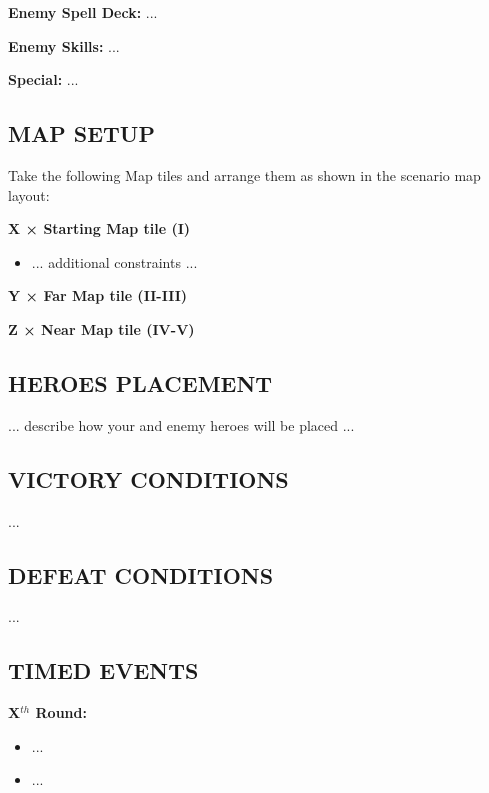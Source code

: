 \begin{multicols*}{2}
\textbf{Enemy Spell Deck:} ...

\textbf{Enemy Skills:} ...

\textbf{Special:} ...

\subsection*{\MakeUppercase{Map setup}}

Take the following Map tiles and arrange them as shown in the scenario map layout:

\textbf{X × Starting Map tile (I)}
\begin{itemize}
    \item ... additional constraints ...
\end{itemize}

\textbf{Y × Far Map tile (II-III)}

\textbf{Z × Near Map tile (IV-V)}

\subsection*{\MakeUppercase{Heroes placement}}

... describe how your and enemy heroes will be placed ...

\subsection*{\MakeUppercase{Victory Conditions}}
...

\subsection*{\MakeUppercase{Defeat Conditions}}
...

\subsection*{\MakeUppercase{Timed Events}}

\textbf{X$^{th}$ Round:}
\begin{itemize}
  \item ...
  \item ...
\end{itemize}

%
%
% 


\end{multicols*}
